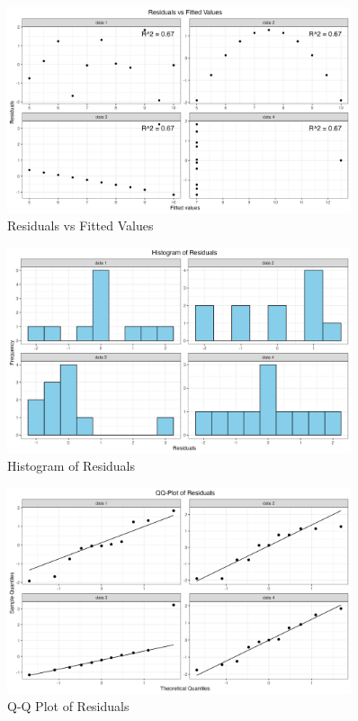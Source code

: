 \documentclass[12pt]{article}
\begin{document}
\lipsum[1-2]


\begin{figure}[!h]
    \centering
    \includegraphics[width=0.9\textwidth]{../results/residuals_vs_fitted.png}
    \caption{Residuals vs Fitted Values}
    \label{fig:residuals_vs_fitted}
\end{figure}

\begin{figure}[!h]
    \centering
    \includegraphics[width=0.9\textwidth]{../results/residuals_histogram.png}
    \caption{Histogram of Residuals}
    \label{fig:residuals_histogram}
\end{figure}

\begin{figure}
    \centering
    \includegraphics[width=0.9\textwidth]{../results/residuals_qq.png}
    \caption{Q-Q Plot of Residuals}
    \label{fig:residuals_qq}
\end{figure}



\clearpage

\end{document}
